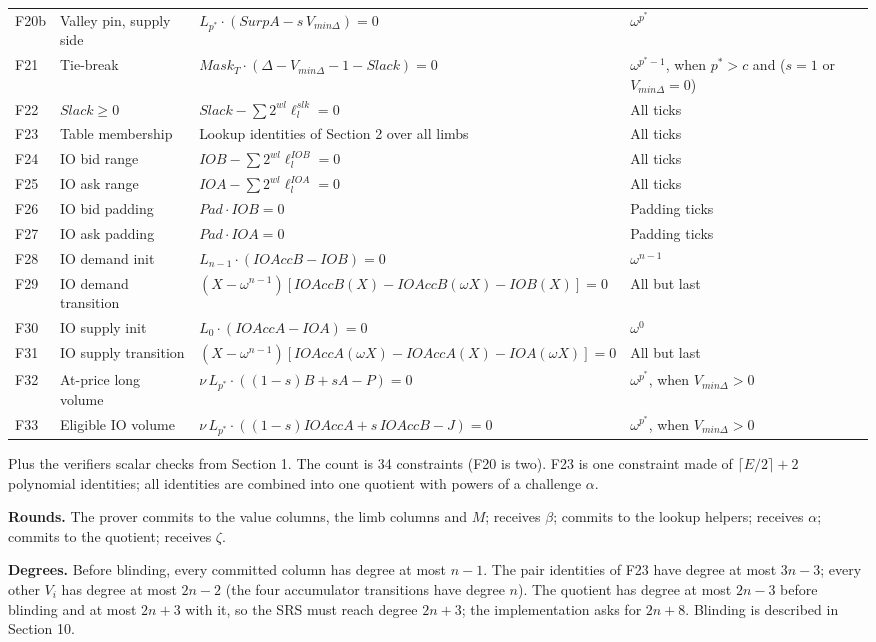 \begin{longtable}[]{@{}llll@{}}
F20b & Valley pin, supply side & \(L_{p^*} \cdot (SurpA - s\,V_{min\Delta}) = 0\) & \(\omega^{p^*}\) \\
F21 & Tie-break & \(Mask_T \cdot (\Delta - V_{min\Delta} - 1 - Slack) = 0\) & \(\omega^{p^*-1}\), when \(p^* > c\) and (\(s=1\) or \(V_{min\Delta}=0\)) \\
F22 & \(Slack \ge 0\) & \(Slack - \sum 2^{wl} \ell^{slk}_l = 0\) & All ticks \\
F23 & Table membership & Lookup identities of Section 2 over all limbs & All ticks \\
F24 & IO bid range & \(IOB - \sum 2^{wl} \ell^{IOB}_l = 0\) & All ticks \\
F25 & IO ask range & \(IOA - \sum 2^{wl} \ell^{IOA}_l = 0\) & All ticks \\
F26 & IO bid padding & \(Pad \cdot IOB = 0\) & Padding ticks \\
F27 & IO ask padding & \(Pad \cdot IOA = 0\) & Padding ticks \\
F28 & IO demand init & \(L_{n-1} \cdot (IOAccB - IOB) = 0\) & \(\omega^{n-1}\) \\
F29 & IO demand transition & \((X-\omega^{n-1})[IOAccB(X) - IOAccB(\omega X) - IOB(X)] = 0\) & All but last \\
F30 & IO supply init & \(L_0 \cdot (IOAccA - IOA) = 0\) & \(\omega^0\) \\
F31 & IO supply transition & \((X-\omega^{n-1})[IOAccA(\omega X) - IOAccA(X) - IOA(\omega X)] = 0\) & All but last \\
F32 & At-price long volume & \(\nu\, L_{p^*} \cdot ((1-s)B + sA - P) = 0\) & \(\omega^{p^*}\), when \(V_{min\Delta} > 0\) \\
F33 & Eligible IO volume & \(\nu\, L_{p^*} \cdot ((1-s)IOAccA + s\,IOAccB - J) = 0\) & \(\omega^{p^*}\), when \(V_{min\Delta} > 0\) \\
\end{longtable}

Plus the verifier\textquotesingle s scalar checks from Section 1. The count is 34 constraints (F20 is two). F23 is one constraint made of \(\lceil E/2 \rceil + 2\) polynomial identities; all identities are combined into one quotient with powers of a challenge \(\alpha\).

\textbf{Rounds.} The prover commits to the value columns, the limb columns and \(M\); receives \(\beta\); commits to the lookup helpers; receives \(\alpha\); commits to the quotient; receives \(\zeta\).

\textbf{Degrees.} Before blinding, every committed column has degree at most \(n-1\). The pair identities of F23 have degree at most \(3n-3\); every other \(V_i\) has degree at most \(2n-2\) (the four accumulator transitions have degree \(n\)). The quotient has degree at most \(2n-3\) before blinding and at most \(2n+3\) with it, so the SRS must reach degree \(2n+3\); the implementation asks for \(2n+8\). Blinding is described in Section 10.

